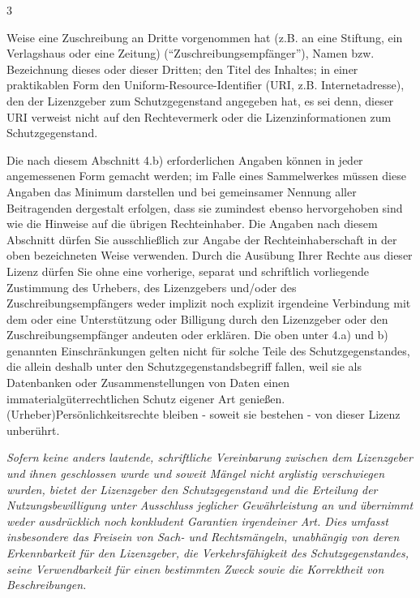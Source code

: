 \begin{WidePar}
\begin{multicols}{3}
\begin{description}
\begin{compactitem}
    Weise eine Zuschreibung an Dritte vorgenommen hat
    (z.B. an eine Stiftung, ein Verlagshaus oder eine
    Zeitung) (\enquote{Zuschreibungsempfänger}), Namen bzw.
    Bezeichnung dieses oder dieser Dritten; den Titel
    des Inhaltes; in einer praktikablen Form den
    Uniform-Resource-Identifier (URI, z.B.
    Internetadresse), den der Lizenzgeber zum
    Schutzgegenstand angegeben hat, es sei denn, dieser
    URI verweist nicht auf den Rechtevermerk oder die
    Lizenzinformationen zum Schutzgegenstand.
  \end{compactitem}
  Die nach diesem Abschnitt 4.b) erforderlichen Angaben
  können in jeder angemessenen Form gemacht werden; im
  Falle eines Sammelwerkes müssen diese Angaben das
  Minimum darstellen und bei gemeinsamer Nennung aller
  Beitragenden dergestalt erfolgen, dass sie zumindest
  ebenso hervorgehoben sind wie die Hinweise auf die
  übrigen Rechteinhaber. Die Angaben nach diesem Abschnitt
  dürfen Sie ausschließlich zur Angabe der
  Rechteinhaberschaft in der oben bezeichneten Weise
  verwenden. Durch die Ausübung Ihrer Rechte aus dieser
  Lizenz dürfen Sie ohne eine vorherige, separat und
  schriftlich vorliegende Zustimmung des Urhebers, des
  Lizenzgebers und/oder des Zuschreibungsempfängers weder
  implizit noch explizit irgendeine Verbindung mit dem
  oder eine Unterstützung oder Billigung durch den
  Lizenzgeber oder den Zuschreibungsempfänger andeuten
  oder erklären.
  Die oben unter 4.a) und b) genannten Einschränkungen
  gelten nicht für solche Teile des Schutzgegenstandes,
  die allein deshalb unter den Schutzgegenstandsbegriff
  fallen, weil sie als Datenbanken oder Zusammenstellungen
  von Daten einen immaterialgüterrechtlichen Schutz
  eigener Art genießen.
  (Urheber)Persönlichkeitsrechte bleiben - soweit sie
  bestehen - von dieser Lizenz unberührt.
  \item[5. Gewährleistung]
  {\itshape Sofern keine anders lautende, schriftliche
  Vereinbarung zwischen dem Lizenzgeber und ihnen geschlossen wurde und
  soweit Mängel nicht arglistig verschwiegen wurden, bietet
  der Lizenzgeber den Schutzgegenstand und die Erteilung der
  Nutzungsbewilligung unter Ausschluss jeglicher
  Gewährleistung an und übernimmt weder ausdrücklich noch
  konkludent Garantien irgendeiner Art. Dies umfasst
  insbesondere das Freisein von Sach- und Rechtsmängeln,
  unabhängig von deren Erkennbarkeit für den Lizenzgeber, die
  Verkehrsfähigkeit des Schutzgegenstandes, seine
  Verwendbarkeit für einen bestimmten Zweck sowie die
  Korrektheit von Beschreibungen.}
  \item[6. Haftungsbeschränkung]

\end{description}
\end{multicols}
\end{WidePar}
